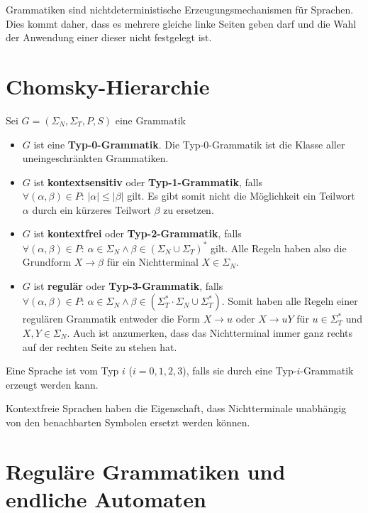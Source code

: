 Grammatiken sind nichtdeterministische Erzeugungsmechanismen für Sprachen. Dies kommt daher, dass es mehrere gleiche linke Seiten geben darf und die Wahl der Anwendung einer dieser nicht festgelegt ist.


\section{Chomsky-Hierarchie}
\begin{definition}
Sei $G = (\Sigma_N, \Sigma_T, P, S)$ eine Grammatik
\begin{itemize}
  \item $G$ ist eine \textbf{Typ-0-Grammatik}. Die Typ-0-Grammatik ist die Klasse aller uneingeschränkten Grammatiken.
  \item $G$ ist \textbf{kontextsensitiv} oder \textbf{Typ-1-Grammatik}, falls $\forall (\alpha, \beta) \in P: \, |\alpha| \leq |\beta|$ gilt. Es gibt somit nicht die Möglichkeit ein Teilwort $\alpha$ durch ein kürzeres Teilwort $\beta$ zu ersetzen.
  \item $G$ ist \textbf{kontextfrei} oder \textbf{Typ-2-Grammatik}, falls $\forall (\alpha, \beta) \in P: \, \alpha \in \Sigma_N \land \beta \in (\Sigma_N \cup \Sigma_T)^*$ gilt. Alle Regeln haben also die Grundform $X \to \beta$ für ein Nichtterminal $X \in \Sigma_N$.
  \item $G$ ist \textbf{regulär} oder \textbf{Typ-3-Grammatik}, falls $\forall (\alpha, \beta) \in P: \, \alpha \in \Sigma_N \land \beta \in (\Sigma_T^* \cdot \Sigma_N \cup \Sigma_T^*)$. Somit haben alle Regeln einer regulären Grammatik entweder die Form $X \to u$ oder $X \to uY$ für $u \in \Sigma_T^*$ und $X, Y \in \Sigma_N$. Auch ist anzumerken, dass das Nichtterminal immer ganz rechts auf der rechten Seite zu stehen hat.\\
\end{itemize}
\end{definition}

\begin{remark}
Eine Sprache ist vom Typ $i$ ($i = 0, 1, 2, 3$), falls sie durch eine Typ-$i$-Grammatik erzeugt werden kann.\\
\end{remark}

Kontextfreie Sprachen haben die Eigenschaft, dass Nichtterminale unabhängig von den benachbarten Symbolen ersetzt werden können.

\section{Reguläre Grammatiken und endliche Automaten}

